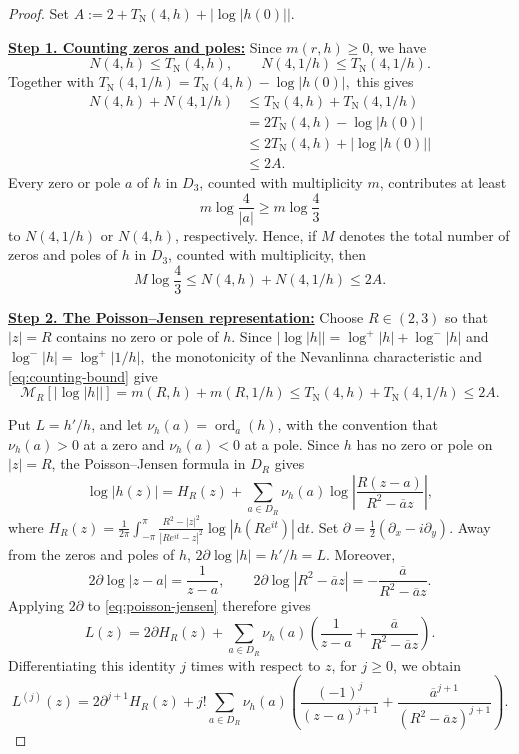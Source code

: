 \documentclass[12pt,letterpaper,reqno]{amsart}
\theoremstyle{definition}
\numberwithin{equation}{section}
\newcommand{\TN}{T_{\mathrm N}}
\newcommand{\mean}[2]{\mathcal M_{#1}\!\left[#2\right]}
\DeclareMathOperator{\ord}{ord}
\begin{document}
\begin{proof}
Set
$
A:=2+\TN(4,h)+|\log|h(0)||.
$

\medskip\noindent
\textbf{\underline{Step 1. Counting zeros and poles:}}
Since \(m(r,h)\ge0\), we have
$$
N(4,h)\le \TN(4,h),
\qquad
N(4,1/h)\le \TN(4,1/h).
$$
Together with
$
\TN(4,1/h)=\TN(4,h)-\log|h(0)|,
$
this gives
\begin{equation}\label{eq:counting-bound}
\begin{aligned}
N(4,h)+N(4,1/h)
&\le \TN(4,h)+\TN(4,1/h)\\
&=2\TN(4,h)-\log|h(0)|\\
&\le 2\TN(4,h)+|\log|h(0)||\\
&\le 2A.
\end{aligned}
\end{equation}
Every zero or pole \(a\) of \(h\) in \(D_3\), counted with multiplicity \(m\), contributes at least
$$
m\log\frac{4}{|a|}
\ge m\log\frac43
$$
to \(N(4,1/h)\) or \(N(4,h)\), respectively. Hence, if \(M\) denotes the total number of zeros and poles of \(h\) in \(D_3\), counted with multiplicity, then
\begin{equation}\label{eq}
M\log\frac43
\le N(4,h)+N(4,1/h)
\le 2A.
\end{equation}


\medskip\noindent
\textbf{\underline{Step 2. The Poisson--Jensen representation:}}
Choose \(R\in(2,3)\) so that \(|z|=R\) contains no zero or pole of \(h\).
Since
$
|\log|h||=\log^+|h|+\log^-|h|
$
and
$
\log^-|h|=\log^+|1/h|,
$
the monotonicity of the Nevanlinna characteristic and
\eqref{eq:counting-bound} give
\begin{equation}\label{eq:boundary-mean}
\mean R{|\log|h||}
=m(R,h)+m(R,1/h)
\leq \TN(4,h)+\TN(4,1/h)
\leq 2A.
\end{equation}

Put \(L=h'/h\), and let \(\nu_h(a)=\ord_a(h)\), with the convention that
\(\nu_h(a)>0\) at a zero and \(\nu_h(a)<0\) at a pole. Since \(h\) has no
zero or pole on \(|z|=R\), the Poisson--Jensen formula in \(D_R\) gives
\begin{equation}\label{eq:poisson-jensen}
\log |h(z)|=H_R(z)
+
\sum_{a\in D_R}\nu_h(a)
\log\left|
\frac{R(z-a)}{R^2-\overline a z}
\right|,
\end{equation}
where
$
H_R(z)=\frac1{2\pi}\int_{-\pi}^{\pi}
\frac{R^2-|z|^2}{|Re^{it}-z|^2}
\log|h(Re^{it})|\,\mathrm dt.
$
Set
$
\partial=\frac12(\partial_x-i\partial_y).
$
Away from the zeros and poles of \(h\),
$
2\partial\log|h|=h'/h=L.
$
Moreover,
$$
2\partial\log|z-a|=\frac1{z-a},
\qquad
2\partial\log|R^2-\overline a z|
=-\frac{\overline a}{R^2-\overline a z}.
$$
Applying \(2\partial\) to \eqref{eq:poisson-jensen} therefore gives
$$
L(z)
=
2\partial H_R(z)
+
\sum_{a\in D_R}\nu_h(a)
\left(
\frac1{z-a}
+
\frac{\overline a}{R^2-\overline a z}
\right).
$$
Differentiating this identity \(j\) times with respect to \(z\), for
\(j\geq0\), we obtain
\begin{equation}\label{eq:Lj-representation}
L^{(j)}(z)=
2\partial^{j+1}H_R(z)
+
j!\sum_{a\in D_R}\nu_h(a)
\left(
\frac{(-1)^j}{(z-a)^{j+1}}
+
\frac{\overline a^{j+1}}
{(R^2-\overline a z)^{j+1}}
\right).
\end{equation}


\end{proof}
\end{document}
